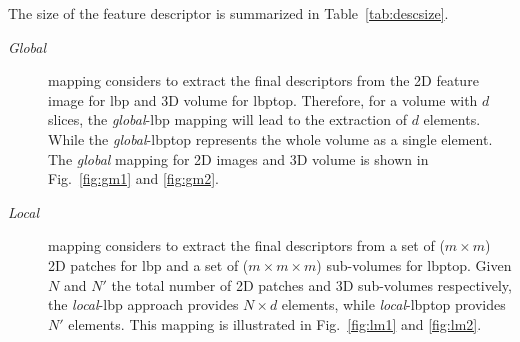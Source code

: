 \begin{table}
\caption{Size of a descriptor for an \ac{sdoct} volume. $d$ denotes the number of slices in the volume, $N$ the number of 2D windows, and $N'$ the number of 3D sub-volumes, respectively.}
\label{tab:descsize}
\end{table}

The size of the feature descriptor is summarized in Table~\ref{tab:descsize}.

\begin{description}
\item[\emph{Global}] mapping considers to extract the final descriptors from the 2D feature image for \ac{lbp} and 3D volume for \ac{lbptop}.
Therefore, for a volume with $d$ slices, the \emph{global}-\ac{lbp} mapping will lead to the extraction of $d$ elements.
While the \emph{global}-\ac{lbptop} represents the whole volume as a single element.
The \emph{global} mapping for 2D images and 3D volume is shown in Fig.~\ref{fig:gm1} and \ref{fig:gm2}.

\item[\emph{Local}] mapping considers to extract the final descriptors from a set of ($m \times m$) 2D patches for \ac{lbp} and a set of ($ m \times m \times m$) sub-volumes for \ac{lbptop}.
Given $N$ and $N'$ the total number of 2D patches and 3D sub-volumes respectively, the \emph{local}-\ac{lbp} approach provides $N \times d$ elements, while \emph{local}-\ac{lbptop} provides $N'$ elements.
This mapping is illustrated in Fig.~\ref{fig:lm1} and \ref{fig:lm2}.


\end{description}

